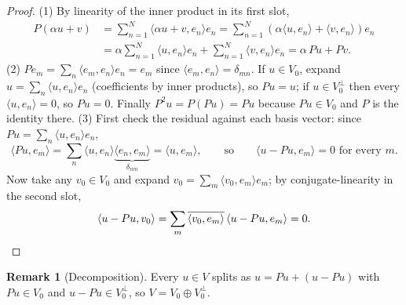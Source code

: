 \documentclass[11pt]{article}
\newcommand{\1}{\mathbf{1}}
\theoremstyle{notestyle}
\theoremstyle{definition}
\newtheorem{remark}[theorem]{Remark}
\begin{document}
\begin{proof}
(1) By linearity of the inner product in its first slot,
\begin{align*}
P(\alpha u + v) &= \sum_{n=1}^{N} \langle \alpha u + v, e_n\rangle e_n
= \sum_{n=1}^{N} \left(\alpha \langle u, e_n\rangle + \langle v, e_n\rangle
\right) e_n \\
&= \alpha \sum_{n=1}^{N} \langle u, e_n\rangle e_n +
\sum_{n=1}^{N} \langle v, e_n\rangle e_n
= \alpha\, Pu + Pv.
\end{align*}
(2) $Pe_m = \sum_{n} \langle e_m, e_n \rangle e_n = e_m$ since $\langle e_m, e_n
\rangle = \delta_{mn}$. If $u \in V_0$, expand $u = \sum_n \langle u, e_n \rangle
e_n$ (coefficients by inner products), so $Pu = u$; if $u \in V_0^{\perp}$ then
every $\langle u, e_n \rangle = 0$, so $Pu = 0$. Finally $P^2u = P(Pu) = Pu$
because $Pu \in V_0$ and $P$ is the identity there.
(3) First check the residual against each basis vector: since $Pu = \sum_n
\langle u, e_n \rangle e_n$,
$$\langle Pu, e_m \rangle = \sum_{n} \langle u, e_n \rangle
\underbrace{\langle e_n, e_m \rangle}_{\delta_{nm}} = \langle u, e_m \rangle,
\qquad \text{so} \qquad \langle u - Pu, e_m \rangle = 0 \text{ for every } m.$$
Now take any $v_0 \in V_0$ and expand $v_0 = \sum_m \langle v_0, e_m \rangle e_m$;
by conjugate-linearity in the second slot,
$$\langle u - Pu, v_0 \rangle = \sum_{m} \overline{\langle v_0, e_m \rangle}\,
\langle u - Pu, e_m \rangle = 0. \qedhere$$
\end{proof}
\begin{remark}[Decomposition]
\label{rem:projection-decomposition}
Every $u \in V$ splits as $u = Pu + (u - Pu)$ with $Pu \in V_0$ and $u - Pu \in
V_0^{\perp}$, so $V = V_0 \oplus V_0^{\perp}$.
\end{remark}
\end{document}
